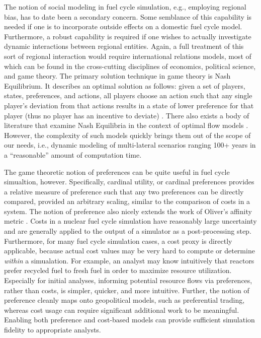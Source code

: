 The notion of social modeling in fuel cycle simulation, e.g., employing regional
bias, has to date been a secondary concern. Some semblance of this capability is
needed if one is to incorporate outside effects on a domestic fuel cycle
model. Furthermore, a robust capability is required if one wishes to actually
investigate dynamic interactions between regional entities. Again, a full
treatment of this sort of regional interaction would require international
relations models, most of which can be found in the cross-cutting disciplines of
economics, political science, and game theory. The primary solution technique in
game theory is Nash Equilibrium. It describes an optimal solution as follows:
given a set of players, states, preferences, and actions, all players choose an
action such that any single player's deviation from that actions results in a
state of lower preference for that player (thus no player has an incentive to
deviate) \cite{mccarty_political_2007}. There also exists a body of literature
that examine Nash Equilibria in the context of optimal flow models
\cite{mazumdar_fairness_1991,nagurney_supply_2002,song_nash_2002}. However, the
complexity of such models quickly brings them out of the scope of our needs,
i.e., dynamic modeling of multi-lateral scenarios ranging 100+ years in a
``reasonable'' amount of computation time. 

The game theoretic notion of preferences can be quite useful in fuel cycle
simualtion, however. Specifically, cardinal utility, or cardinal preferences
\cite{strotz_cardinal_1953} provides a relative measure of preference such that
any two preferences can be directly compared, provided an arbitrary scaling,
similar to the comparison of costs in a system. The notion of preference also
nicely extends the work of Oliver's affinity metric
\cite{oliver_geniusv2:_2009}. Costs in a nuclear fuel cycle simulation have
reasonably large uncertainty \cite{shropshire_advanced_2009} and are generally
applied to the output of a simulator as a post-processing step. Furthermore, for
many fuel cycle simulation cases, a cost proxy is directly applicable, because
actual cost values may be very hard to compute or determine \textit{within} a
simualation. For example, an analyst may know intuitively that reactors prefer
recycled fuel to fresh fuel in order to maximize resource
utilization. Especially for initial analyses, informing potential resource flows
via preferences, rather than costs, is simpler, quicker, and more
intuitive. Further, the notion of preference cleanly maps onto geopolitical
models, such as preferential trading, whereas cost usage can require significant
additional work to be meaningful. Enabling both preference and cost-based models
can provide sufficient simulation fidelity to appropriate analysts.

